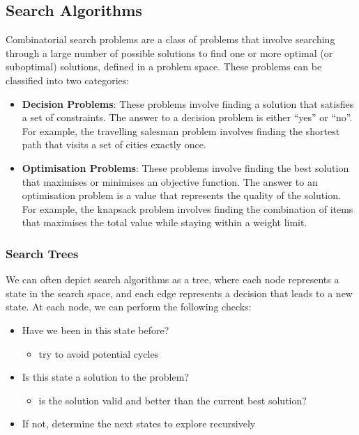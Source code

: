 \documentclass{article}
\begin{document}
\subsection{Search Algorithms}
Combinatorial search problems are a class of problems that involve
searching through a large number of possible solutions to find one or
more optimal (or suboptimal) solutions, defined in a problem space.
These problems can be classified into two categories:
\begin{itemize}
    \item \textbf{Decision Problems}: These problems involve finding a
          solution that satisfies a set of constraints. The answer to a
          decision problem is either ``yes'' or ``no''. For example, the
          travelling salesman problem involves finding the shortest path
          that visits a set of cities exactly once.
    \item \textbf{Optimisation Problems}: These problems involve finding
          the best solution that maximises or minimises an objective
          function. The answer to an optimisation problem is a value
          that represents the quality of the solution. For example,
          the knapsack problem involves finding the combination of
          items that maximises the total value while staying within a
          weight limit.
\end{itemize}
\subsubsection{Search Trees}
We can often depict search algorithms as a tree, where each node
represents a state in the search space, and each edge represents a
decision that leads to a new state. At each node, we can perform the
following checks:
\begin{itemize}
    \item Have we been in this state before?
          \begin{itemize}
              \item try to avoid potential cycles
          \end{itemize}
    \item Is this state a solution to the problem?
          \begin{itemize}
              \item is the solution valid and better than the current
                    best solution?
          \end{itemize}
    \item If not, determine the next states to explore recursively
\end{itemize}
\end{document}
